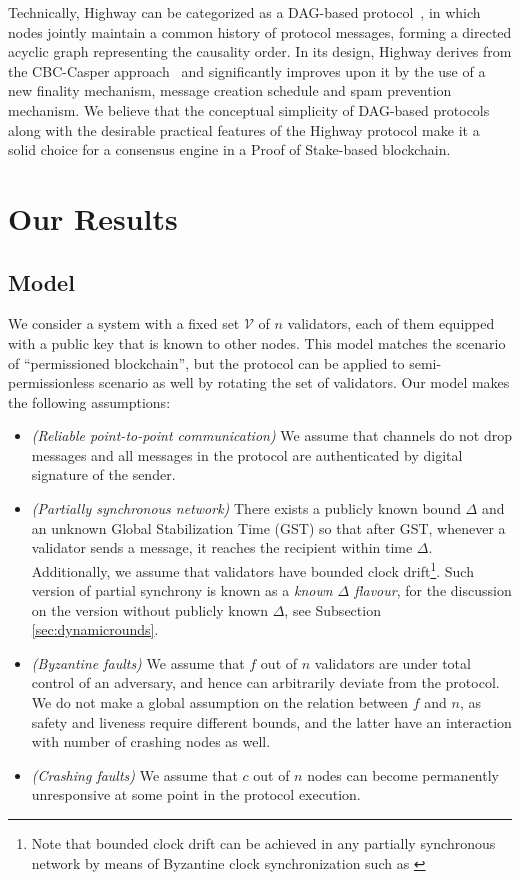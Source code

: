 \documentclass[12pt, fleqn]{article}
\begin{document}
Technically, Highway can be categorized as a DAG-based protocol~\cite{baird2016hashgraph,GLSS19,moser1999byzantine,zamfir2018casper}, in which nodes jointly maintain a common history of protocol messages, forming a directed acyclic graph representing the causality order.
%
In its design, Highway derives from the CBC-Casper approach~\cite{zamfir2018casper} and significantly improves upon it by the use of a new finality mechanism, message creation schedule and spam prevention mechanism.
%
We believe that the conceptual simplicity of DAG-based protocols along with the desirable practical features of the Highway protocol make it a solid choice for a consensus engine in a Proof of Stake-based blockchain. 




\section{Our Results}

\subsection{Model}

We consider a system with a fixed set $\mathcal{V}$ of $n$ validators, each of them equipped with a public key that is known to other nodes.
This model matches the scenario of ``permissioned blockchain'', but the protocol can be applied to semi-permissionless scenario as well by rotating the set of validators.
Our model makes the following assumptions:
\begin{itemize}
    \item\emph{(Reliable point-to-point communication)}
    We assume that channels do not drop messages and all messages in the protocol are authenticated by digital signature of the sender.
    \item\emph{(Partially synchronous network)} There exists a publicly known bound $\Delta$ and an unknown Global Stabilization Time (GST) so that after GST, whenever a validator sends a message, it reaches the recipient within time $\Delta$. Additionally, we assume that validators have bounded clock drift\footnote{Note that bounded clock drift can be achieved in any partially synchronous network by means of Byzantine clock synchronization such as \cite{DLS88}}. 
    Such version of partial synchrony is known as a \emph{known $\Delta$ flavour}, for the discussion on the version without publicly known $\Delta$, see Subsection \ref{sec:dynamicrounds}.
    \item\emph{(Byzantine faults)} We assume that $f$ out of $n$ validators are under total control of an adversary, and hence can arbitrarily deviate from the protocol. We do not make a global assumption on the relation between $f$ and $n$, as safety and liveness require different bounds, and the latter have an interaction with number of crashing nodes as well.
    \item\emph{(Crashing faults)} We assume that $c$ out of $n$ nodes can become permanently unresponsive at some point in the protocol execution.
\end{itemize}
\end{document}
